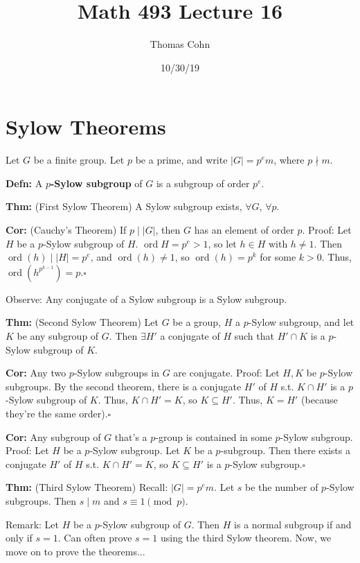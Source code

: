 \documentclass[10pt,letterpaper]{article}
\author{Thomas Cohn}
\title{Math 493 Lecture 16}
\date{10/30/19} %
\newcommand{\n}{\hfill\break}
\newcommand{\hangblock}[2]{\par\noindent\settowidth{\hangindent}{\textbf{#1: }}\textbf{#1: }\!\!\!#2}
\newcommand{\defn}[1]{\hangblock{Defn}{#1}}
\newcommand{\thm}[1]{\hangblock{Thm}{#1}}
\newcommand{\cor}[1]{\hangblock{Cor}{#1}}
\newcommand{\proven}{\;$\square$\n}
\newcommand{\card}[1]{\left|#1\right|}
\newcommand{\ndiv}{\nmid}
\DeclareMathOperator{\ord}{ord}
\newcommand{\st}{s.t.}
\begin{document}
\maketitle
\setlength\RaggedRightParindent{\parindent}
\RaggedRight

\section*{Sylow Theorems}

\par\noindent
Let $G$ be a finite group. Let $p$ be a prime, and write $\card{G}=p^{e}m$, where $p\ndiv{}m$.\n

\defn{
	A \textbf{$p$-Sylow subgroup} of $G$ is a subgroup of order $p^{e}$.\n
}

\thm{
	(First Sylow Theorem) A Sylow subgroup exists, $\forall{}G$, $\forall{}p$.\n
}

\cor{
	(Cauchy's Theorem) If $p\mid\card{G}$, then $G$ has an element of order $p$.\n
	Proof: Let $H$ be a $p$-Sylow subgroup of $H$. $\ord{H}=p^{e}>1$, so let $h\in{}H$ with $h\ne{}1$. Then $\ord(h)\mid\card{H}=p^{e}$, and $\ord(h)\ne{}1$, so $\ord(h)=p^{k}$ for some $k>0$. Thus, $\ord(h^{p^{k-1}})=p$.\proven
}

\par\noindent
Observe: Any conjugate of a Sylow subgroup is a Sylow subgroup.\n

\thm{
	(Second Sylow Theorem) Let $G$ be a group, $H$ a $p$-Sylow subgroup, and let $K$ be any subgroup of $G$. Then $\exists{}H'$ a conjugate of $H$ such that $H'\cap{}K$ is a $p$-Sylow subgroup of $K$.\n
}

\cor{
	Any two $p$-Sylow subgroups in $G$ are conjugate.\n
	Proof: Let $H,K$ be $p$-Sylow subgroups. By the second theorem, there is a conjugate $H'$ of $H$ \st{} $K\cap{}H'$ is a $p$-Sylow subgroup of $K$. Thus, $K\cap{}H'=K$, so $K\subseteq{}H'$. Thus, $K=H'$ (because they're the same order).\proven
}

\cor{
	Any subgroup of $G$ that's a $p$-group is contained in some $p$-Sylow subgroup.\n
	Proof: Let $H$ be a $p$-Sylow subgroup. Let $K$ be a $p$-subgroup. Then there exists a conjugate $H'$ of $H$ \st{} $K\cap{}H'=K$, so $K\subseteq{}H'$ is a $p$-Sylow subgroup.\proven
}

\thm{
	(Third Sylow Theorem) Recall: $\card{G}=p^{e}m$. Let $s$ be the number of $p$-Sylow subgroups. Then $s\mid{}m$ and $s\equiv{}1\pmod{p}$.\n
}

\par\noindent
Remark: Let $H$ be a $p$-Sylow subgroup of $G$. Then $H$ is a normal subgroup if and only if $s=1$. Can often prove $s=1$ using the third Sylow theorem.\n
Now, we move on to prove the theorems...\n
\end{document}
